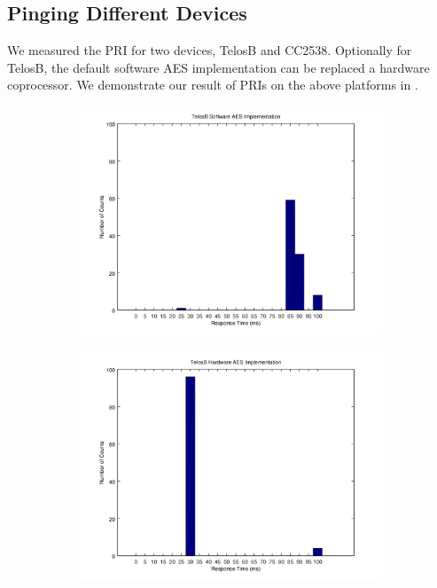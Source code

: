
\subsection{Pinging Different Devices} \label{PingDevice}
We measured the PRI for two devices, TelosB\cite{TelosB} and CC2538\cite{CC2538}. Optionally for TelosB, the default software AES implementation can be replaced a hardware coprocessor. We demonstrate our result of PRIs on the above platforms in .

\begin{figure}[ht!]
	\centering
	\begin{subfigure}{0.4\textwidth}
	{
		\includegraphics[width=\textwidth]{fig/noncoresec_ping_telosb_sw.png}
	}
	\end{subfigure}
	\begin{subfigure}{0.4\textwidth}
	{
		\includegraphics[width=\textwidth]{fig/noncoresec_ping_telosb_hw.png}
}
\end{subfigure}
\end{figure}
